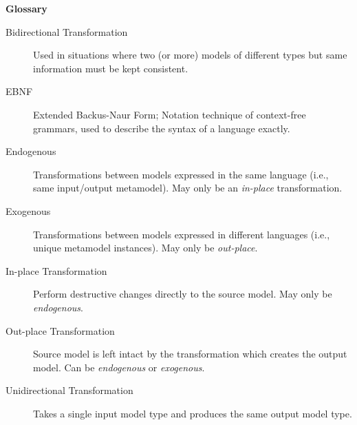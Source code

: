 \newpage
{}
{}
\hypertarget{glossary}{}

\vspace{1cm}
{\Huge \bf Glossary}
\vspace{1cm}

\begin{description}

\item[Bidirectional Transformation]  Used in situations where two (or more) models of different types but same information must be kept consistent.

\item[EBNF] Extended Backus-Naur Form; Notation technique of context-free grammars, used to describe the syntax of a language exactly.

\item[Endogenous] Transformations between models expressed in the same language (i.e., same input/output metamodel). May only be an \emph{in-place}
transformation.
 
\item[Exogenous] Transformations between models expressed in different languages (i.e., unique metamodel instances). May only be \emph{out-place}.

\item[In-place Transformation] Perform destructive changes directly to the source model. May only be \emph{endogenous}.

\item[Out-place Transformation] Source model is left intact by the transformation which creates the output model. Can be \emph{endogenous} or \emph{exogenous}.

\item[Unidirectional Transformation] Takes a single input model type and produces the same output model type.

\end{description}
